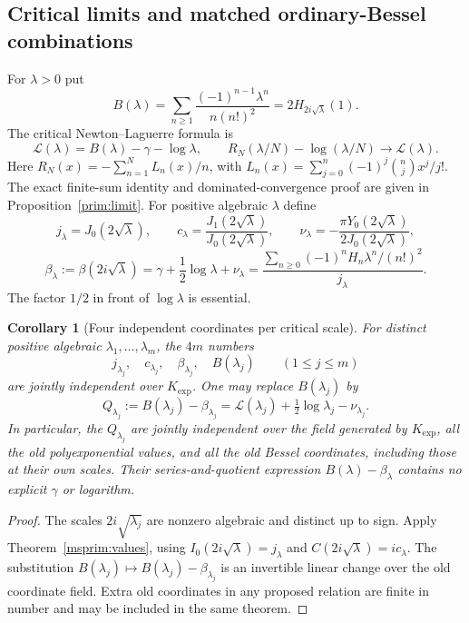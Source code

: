 \documentclass[11pt]{article}
\newtheorem{corollary}[theorem]{Corollary}
\theoremstyle{definition}
\theoremstyle{remark}
\begin{document}
\subsection{Critical limits and matched ordinary-Bessel combinations}
For $\lambda>0$ put
\[
 B(\lambda)=\sum_{n\ge1}\frac{(-1)^{n-1}\lambda^n}{n(n!)^2}
           =2H_{2i\sqrt\lambda}(1).
\]
The critical Newton--Laguerre formula is
\[
 \mathcal L(\lambda)=B(\lambda)-\gamma-\log\lambda,
 \qquad
 R_N(\lambda/N)-\log(\lambda/N)\longrightarrow\mathcal L(\lambda).
\]
Here $R_N(x)=-\sum_{n=1}^N L_n(x)/n$, with
$L_n(x)=\sum_{j=0}^n(-1)^j\binom njx^j/j!$.
The exact finite-sum identity and dominated-convergence proof are given
in Proposition~\ref{prim:limit}.
For positive algebraic $\lambda$ define
\[
 j_\lambda=J_0(2\sqrt\lambda),\qquad
 c_\lambda=\frac{J_1(2\sqrt\lambda)}{J_0(2\sqrt\lambda)},\qquad
 \nu_\lambda=-\frac{\pi Y_0(2\sqrt\lambda)}{2J_0(2\sqrt\lambda)},
\]
\begin{equation}\label{msprim:betaordinary}
 \beta_\lambda:=\beta(2i\sqrt\lambda)
 =\gamma+\frac12\log\lambda+\nu_\lambda
 =\frac{\displaystyle\sum_{n\ge0}
              (-1)^nH_n\lambda^n/(n!)^2}{j_\lambda}.
\end{equation}
The factor $1/2$ in front of $\log\lambda$ is essential.

\begin{corollary}[Four independent coordinates per critical scale]
\label{msprim:matched}
For distinct positive algebraic $\lambda_1,\ldots,\lambda_m$, the
$4m$ numbers
\[
 j_{\lambda_j},\quad c_{\lambda_j},\quad
 \beta_{\lambda_j},\quad B(\lambda_j)
 \qquad(1\le j\le m)
\]
are jointly independent over $K_{\exp}$. One may replace
$B(\lambda_j)$ by
\begin{equation}\label{msprim:Q}
 Q_{\lambda_j}:=B(\lambda_j)-\beta_{\lambda_j}
 =\mathcal L(\lambda_j)+\tfrac12\log\lambda_j-\nu_{\lambda_j}.
\end{equation}
In particular, the $Q_{\lambda_j}$ are jointly independent over the
field generated by $K_{\exp}$, all the old polyexponential values,
and all the old Bessel coordinates, including those at their own
scales. Their series-and-quotient expression $B(\lambda)-\beta_\lambda$
contains no explicit $\gamma$ or logarithm.
\end{corollary}
\begin{proof}
The scales $2i\sqrt{\lambda_j}$ are nonzero algebraic and distinct
up to sign. Apply Theorem~\ref{msprim:values}, using
$I_0(2i\sqrt\lambda)=j_\lambda$ and
$C(2i\sqrt\lambda)=i c_\lambda$. The substitution
$B(\lambda_j)\mapsto B(\lambda_j)-\beta_{\lambda_j}$ is an invertible
linear change over the old coordinate field. Extra old coordinates
in any proposed relation are finite in number and may be included
in the same theorem.
\end{proof}
\end{document}

